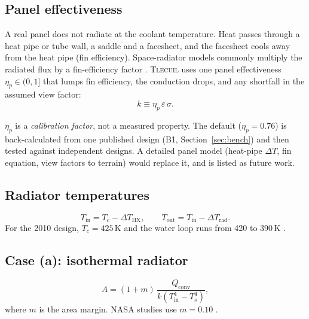\documentclass[11pt]{article}
\numberwithin{equation}{section}
\numberwithin{table}{section}
\newcommand{\tlecuil}{\textsc{Tlecuil}}
\begin{document}
\subsection{Panel effectiveness}\label{sec:etap}
A real panel does not radiate at the coolant temperature. Heat passes through a
heat pipe or tube wall, a saddle and a facesheet, and the facesheet cools away from
the heat pipe (fin efficiency). Space-radiator models commonly multiply the
radiated flux by a fin-efficiency factor \cite{wang2021entropy,gilmore2002thermal}.
\tlecuil{} uses one panel effectiveness $\eta_p\in(0,1]$ that lumps fin efficiency,
the conduction drops, and any shortfall in the assumed view factor:
\begin{equation}
  k \equiv \eta_p\,\varepsilon\,\sigma .
  \label{eq:k}
\end{equation}

\begin{review}
$\eta_p$ is a \emph{calibration factor}, not a measured property. The default
($\eta_p=0.76$) is back-calculated from one published design (B1,
Section~\ref{sec:bench}) and then tested against independent designs. A detailed
panel model (heat-pipe $\Delta T$, fin equation, view factors to terrain) would
replace it, and is listed as future work.
\end{review}

\subsection{Radiator temperatures}
\begin{equation}
  T_\text{in} = T_c - \Delta T_\text{HX}, \qquad T_\text{out} = T_\text{in} - \Delta T_\text{rad}.
  \label{eq:tin}
\end{equation}
For the 2010 design, $T_c=425$\,K and the water loop runs from 420 to 390\,K
\cite{fsp2010icd}.

\subsection{Case (a): isothermal radiator}
\begin{equation}
  A = (1+m)\,\frac{Q_\text{conv}}{k\left(T_\text{in}^4 - T_s^4\right)},
  \label{eq:aiso}
\end{equation}
where $m$ is the area margin. NASA studies use $m=0.10$ \cite{fsp2010icd,mason2025trades}.
\end{document}
